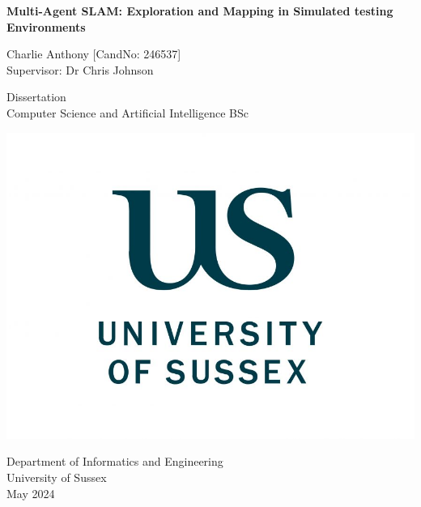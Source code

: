 \documentclass[12pt]{article}
\begin{document}
\begin{titlepage}
    \centering
    \vspace*{5cm}

    \Large
    \textbf{Multi-Agent SLAM: Exploration and Mapping in Simulated testing Environments}

    \vspace{1cm}

    Charlie Anthony [CandNo: 246537]\\
    Supervisor: Dr Chris Johnson



    \vfill

    \vspace{1cm}

    \small
    Dissertation\\
    Computer Science and Artificial Intelligence BSc

    \includegraphics[width=0.3\linewidth]{sussex_logo.jpg}


    \small
    Department of Informatics and Engineering\\
    University of Sussex\\
    May 2024
\end{titlepage}

\tableofcontents
\newpage
\end{document}
